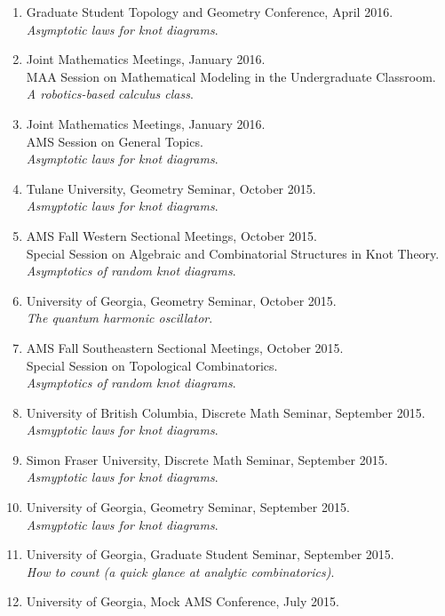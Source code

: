 \documentclass[letterpaper]{article}
\begin{document}
\begin{enumerate}
\item Graduate Student Topology and Geometry Conference, April 2016.\\
  \textit{Asymptotic laws for knot diagrams}.
\item Joint Mathematics Meetings, January 2016.\\
  MAA Session on Mathematical Modeling in the Undergraduate Classroom. \\
  \textit{A robotics-based calculus class}.
\item Joint Mathematics Meetings, January 2016.\\
  AMS Session on General Topics. \\
  \textit{Asymptotic laws for knot diagrams}.
\item Tulane University, Geometry Seminar, October 2015.\\
  \textit{Asmyptotic laws for knot diagrams}.
\item AMS Fall Western Sectional Meetings, October 2015.\\
  Special Session on Algebraic and Combinatorial Structures in Knot Theory. \\
  \textit{Asymptotics of random knot diagrams}.
\item University of Georgia, Geometry Seminar, October 2015.\\
  \textit{The quantum harmonic oscillator}.
\item AMS Fall Southeastern Sectional Meetings, October 2015.\\
  Special Session on Topological Combinatorics. \\
  \textit{Asymptotics of random knot diagrams}.
\item University of British Columbia, Discrete Math Seminar, September 2015.\\
  \textit{Asmyptotic laws for knot diagrams}.
\item Simon Fraser University, Discrete Math Seminar, September 2015.\\
  \textit{Asmyptotic laws for knot diagrams}.
\item University of Georgia, Geometry Seminar, September 2015.\\
  \textit{Asmyptotic laws for knot diagrams}.
\item University of Georgia, Graduate Student Seminar, September 2015.\\
  \textit{How to count (a quick glance at analytic combinatorics)}.
\item University of Georgia, Mock AMS Conference, July 2015.\\

\end{enumerate}
\end{document}
